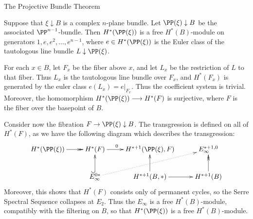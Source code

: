 \documentclass[11pt]{article}
\newcommand{\myheading}[1]
{{\noindent\Large #1}

}
\begin{document}
\myheading{The Projective Bundle Theorem}
Suppose that $\xi\downarrow B$ is a complex $n$-plane bundle. Let $\PP(\xi)\downarrow B$ be the associated $\PP^{n-1}$-bundle. Then $H^*(\PP(\xi))$ is a free $H^*(B)$-module on generators $1,e,e^2,\ldots,e^{n-1}$, where $e\in H^*(\PP(\xi))$ is the Euler class of the tautologous line bundle $L\downarrow \PP(\xi)$.

For each $x\in B$, let $F_x$ be the fiber above $x$, and let $L_x$ be the restriction of $L$ to that fiber. Thus $L_x$ is the tautologous line bundle over $F_x$, and $H^*(F_x)$ is generated by the euler class $e(L_x)=e|_{F_x}$. Thus the coefficient system is trivial. Moreover, the homomorphism $H^*(\PP(\xi))\to H^*(F)$ is surjective, where $F$ is the fiber over the basepoint of $B$.

Consider now the fibration $F \rightarrow\PP(\xi)\downarrow B$. The transgression is defined on all of $H^*(F)$, as we have the following diagram which describes the transgression:
\[\xymatrix{
H^*(\PP(\xi))\ar@{->>}[r]&H^*(F)\ar[r]^{0\ \ \ \ \ }&H^{*+1}(\PP(\xi),F)&E_\infty^{*+1,0}\\
&E_\infty^{0*}\ar@{^{(}->}[u]\ar@{.>}[rur]&H^{*+1}(B,*)\ar[u]\ar[r]&H^{*+1}(B)\ar@{->>}[u]
}\]
Moreover, this shows that $H^*(F)$ consists only of permanent cycles, so the Serre Spectral Sequence collapses at $E_2$. Thus the $E_\infty$ is a free $H^*(B)$-module, compatibly with the filtering on $B$, so that $H^*(\PP(\xi))$ is a free $H^*(B)$-module.


\pagebreak
\end{document}

